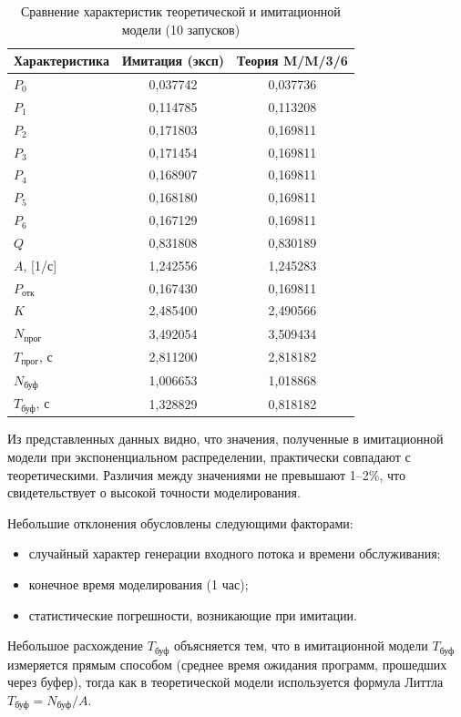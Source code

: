 \documentclass[14pt,a4paper]{extarticle}
\begin{document}
\begin{table}[H]
\centering
\caption{Сравнение характеристик теоретической и имитационной модели (10 запусков)}
\label{tab:verif}
\begin{tabular}{lcc}
\toprule
Характеристика & Имитация (эксп) & Теория M/M/3/6 \\
\midrule
$P_0$ & 0{,}037742 & 0{,}037736 \\
$P_1$ & 0{,}114785 & 0{,}113208 \\
$P_2$ & 0{,}171803 & 0{,}169811 \\
$P_3$ & 0{,}171454 & 0{,}169811 \\
$P_4$ & 0{,}168907 & 0{,}169811 \\
$P_5$ & 0{,}168180 & 0{,}169811 \\
$P_6$ & 0{,}167129 & 0{,}169811 \\
$Q$   & 0{,}831808 & 0{,}830189 \\
$A$, [1/с] & 1{,}242556 & 1{,}245283 \\
$P_{\text{отк}}$ & 0{,}167430 & 0{,}169811 \\
$K$   & 2{,}485400 & 2{,}490566 \\
$N_{\text{прог}}$ & 3{,}492054 & 3{,}509434 \\
$T_{\text{прог}}$, с & 2{,}811200 & 2{,}818182 \\
$N_{\text{буф}}$ & 1{,}006653 & 1{,}018868 \\
$T_{\text{буф}}$, с & 1{,}328829 & 0{,}818182 \\
\bottomrule
\end{tabular}
\end{table}

Из представленных данных видно, что значения, полученные в имитационной модели
при экспоненциальном распределении, практически совпадают с теоретическими.
Различия между значениями не превышают 1--2\%, что свидетельствует о высокой
точности моделирования.

Небольшие отклонения обусловлены следующими факторами:
\begin{itemize}
  \item случайный характер генерации входного потока и времени обслуживания;
  \item конечное время моделирования (1 час);
  \item статистические погрешности, возникающие при имитации.
\end{itemize}

Небольшое расхождение $T_{\text{буф}}$ объясняется тем, что в имитационной
модели $T_{\text{буф}}$ измеряется прямым способом (среднее время ожидания
программ, прошедших через буфер), тогда как в теоретической модели используется
формула Литтла $T_{\text{буф}} = N_{\text{буф}} / A$.
\end{document}
